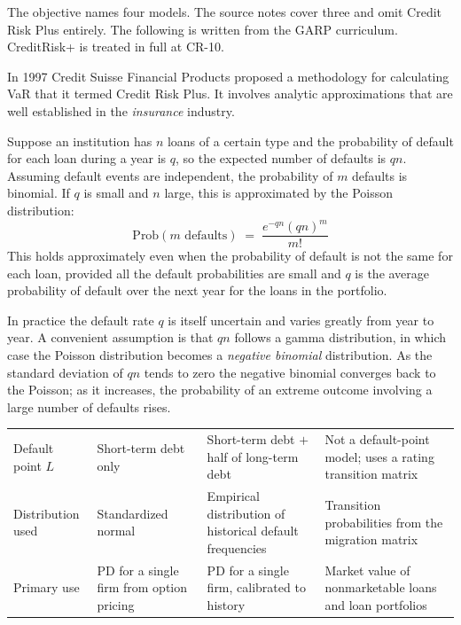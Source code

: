 \gapbadge

{\footnotesize\color{FRMGrey}The objective names four models. The source notes
cover three and omit Credit Risk Plus entirely. The following is written from the
GARP curriculum. CreditRisk+ is treated in full at CR-10.}

\begin{crgapbox}
In 1997 Credit Suisse Financial Products proposed a methodology for calculating
VaR that it termed Credit Risk Plus. It involves analytic approximations that are
well established in the \emph{insurance} industry.

\smallskip
Suppose an institution has $n$ loans of a certain type and the probability of
default for each loan during a year is $q$, so the expected number of defaults is
$qn$. Assuming default events are independent, the probability of $m$ defaults is
binomial. If $q$ is small and $n$ large, this is approximated by the Poisson
distribution:
\[ \text{Prob}(m \text{ defaults}) \;=\; \frac{e^{-qn}(qn)^{m}}{m!} \]
This holds approximately even when the probability of default is not the same for
each loan, provided all the default probabilities are small and $q$ is the average
probability of default over the next year for the loans in the portfolio.

\smallskip
In practice the default rate $q$ is itself uncertain and varies greatly from year
to year. A convenient assumption is that $qn$ follows a gamma distribution, in
which case the Poisson distribution becomes a \emph{negative binomial}
distribution. As the standard deviation of $qn$ tends to zero the negative
binomial converges back to the Poisson; as it increases, the probability of an
extreme outcome involving a large number of defaults rises.
\end{crgapbox}

\begin{center}
\footnotesize
\begin{tabular}{L{2.4cm} L{3.7cm} L{3.9cm} L{4.4cm}}
\toprule
 &  &  &  \\
\midrule
Default point $L$ & Short-term debt only &
  Short-term debt $+$ half of long-term debt &
  Not a default-point model; uses a rating transition matrix \\
Distribution used & Standardized normal &
  Empirical distribution of historical default frequencies &
  Transition probabilities from the migration matrix \\
Primary use & PD for a single firm from option pricing &
  PD for a single firm, calibrated to history &
  Market value of nonmarketable loans and loan portfolios \\
\bottomrule
\end{tabular}
\end{center}

